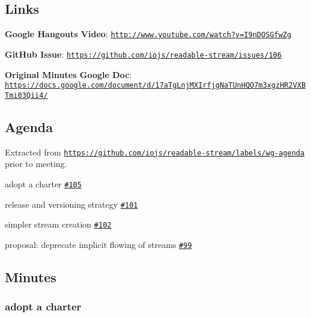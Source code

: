 \subsection*{Links}


\begin{DoxyItemize}
\item {\bfseries Google Hangouts Video}\+: \href{http://www.youtube.com/watch?v=I9nDOSGfwZg}{\tt http\+://www.\+youtube.\+com/watch?v=\+I9n\+D\+O\+S\+Gfw\+Zg}
\item {\bfseries Git\+Hub Issue}\+: \href{https://github.com/iojs/readable-stream/issues/106}{\tt https\+://github.\+com/iojs/readable-\/stream/issues/106}
\item {\bfseries Original Minutes Google Doc}\+: \href{https://docs.google.com/document/d/17aTgLnjMXIrfjgNaTUnHQO7m3xgzHR2VXBTmi03Qii4/}{\tt https\+://docs.\+google.\+com/document/d/17a\+Tg\+Lnj\+M\+X\+Irfjg\+Na\+T\+Un\+H\+Q\+O7m3xgz\+H\+R2\+V\+X\+B\+Tmi03\+Qii4/}
\end{DoxyItemize}

\subsection*{Agenda}

Extracted from \href{https://github.com/iojs/readable-stream/labels/wg-agenda}{\tt https\+://github.\+com/iojs/readable-\/stream/labels/wg-\/agenda} prior to meeting.


\begin{DoxyItemize}
\item adopt a charter \href{https://github.com/iojs/readable-stream/issues/105}{\tt \#105}
\item release and versioning strategy \href{https://github.com/iojs/readable-stream/issues/101}{\tt \#101}
\item simpler stream creation \href{https://github.com/iojs/readable-stream/issues/102}{\tt \#102}
\item proposal\+: deprecate implicit flowing of streams \href{https://github.com/iojs/readable-stream/issues/99}{\tt \#99}
\end{DoxyItemize}

\subsection*{Minutes}

\subsubsection*{adopt a charter}



